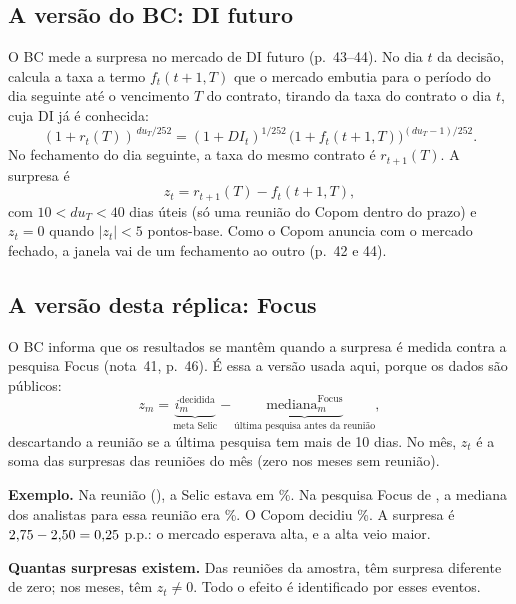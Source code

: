 \documentclass[11pt,a4paper]{article}
\begin{document}
\subsection{A versão do BC: DI futuro}
O BC mede a surpresa no mercado de DI futuro (p.~43–44). No dia $t$ da decisão, calcula a taxa a
termo $f_t(t+1,T)$ que o mercado embutia para o período do dia seguinte até o vencimento $T$ do
contrato, tirando da taxa do contrato o dia $t$, cuja DI já é conhecida:
\begin{equation}
(1+r_t(T))^{\,du_T/252} = (1+DI_t)^{1/252}\,\bigl(1+f_t(t+1,T)\bigr)^{(du_T-1)/252}.
\end{equation}
No fechamento do dia seguinte, a taxa do mesmo contrato é $r_{t+1}(T)$. A surpresa é
\begin{equation}
z_t = r_{t+1}(T) - f_t(t+1,T),
\end{equation}
com $10 < du_T < 40$ dias úteis (só uma reunião do Copom dentro do prazo) e $z_t=0$ quando
$|z_t|<5$ pontos-base. Como o Copom anuncia com o mercado fechado, a janela vai de um fechamento ao
outro (p.~42 e 44).

\subsection{A versão desta réplica: Focus}
O BC informa que os resultados se mantêm quando a surpresa é medida contra a pesquisa Focus
(nota~41, p.~46). É essa a versão usada aqui, porque os dados são públicos:
\begin{equation}
z_m = \underbrace{i^{\text{decidida}}_m}_{\text{meta Selic}} - \underbrace{\text{mediana}^{\text{Focus}}_m}_{\text{última pesquisa antes da reunião}},
\end{equation}
descartando a reunião se a última pesquisa tem mais de 10 dias. No mês, $z_t$ é a soma das
surpresas das reuniões do mês (zero nos meses sem reunião).

\textbf{Exemplo.} Na reunião \ExReuniao{} (\ExData), a Selic estava em \ExAnterior\%. Na pesquisa
Focus de \ExFocusData, a mediana dos analistas para essa reunião era \ExMediana\%. O Copom decidiu
\ExDecisao\%. A surpresa é $2{,}75 - 2{,}50 = 0{,}25$ p.p.: o mercado esperava alta, e a
alta veio maior.

\textbf{Quantas surpresas existem.} Das \Nreunioes{} reuniões da amostra, \Nsurpresas{} têm surpresa
diferente de zero; nos \Nmeses{} meses, \Nmesessurp{} têm $z_t\neq 0$. Todo o efeito é identificado
por esses eventos.

\begin{table}[H]\centering\small
\caption{Reuniões com surpresa diferente de zero (mar/2011--jun/2025)}

\end{table}
\end{document}
